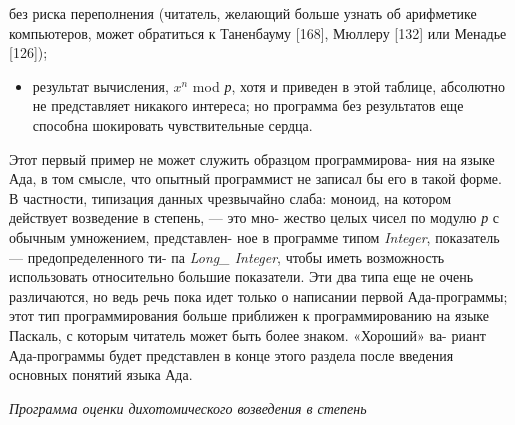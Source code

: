 \newpage
\begin{center}
\parbox{12cm}{
без риска переполнения (читатель, желающий больше узнать об
арифметике компьютеров, может обратиться к Таненбауму [168],
Мюллеру [132] или Менадье [126]);}
\end{center}
\begin{itemize}
\item результат вычисления, $x^n$ mod {\it р}, хотя и приведен в этой таблице,\linebreak
абсолютно не представляет никакого интереса; но программа без\linebreak
результатов еще способна шокировать чувствительные сердца.
\end{itemize}

 Этот первый пример не может служить образцом программирова­- \linebreak
ния на языке Ада, в том смысле, что опытный программист не записал\linebreak
бы его в такой форме. В частности, типизация данных чрезвычайно\linebreak
слаба: моноид, на котором действует возведение в степень, — это мно­-\linebreak
жество целых чисел по модулю {\it р} с обычным умножением, представлен­-\linebreak
ное в программе типом {\it Integer}, показатель — предопределенного ти­-\linebreak
па {\it Long\_ Integer}, чтобы иметь возможность использовать относительно\linebreak
большие показатели. Эти два типа еще не очень различаются, но ведь\linebreak
речь пока идет только о написании первой Ада-программы; этот тип\linebreak
программирования больше приближен к программированию на языке\linebreak
Паскаль, с которым читатель может быть более знаком. «Хороший» ва­-\linebreak
риант Ада-программы будет представлен в конце этого раздела после\linebreak
введения основных понятий языка Ада.
\begin{center}
\parbox{8cm}{
{\it {\small Программа оценки дихотомического возведения в степень}}}
\end{center}
